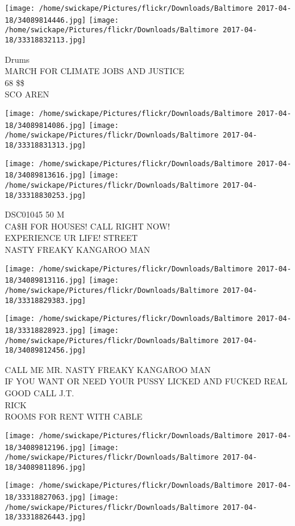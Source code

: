 \documentclass[10pt,letterpaper]{article}
\begin{document}
\texttt{[image: /home/swickape/Pictures/flickr/Downloads/Baltimore 2017-04-18/34089814446.jpg]}
\texttt{[image: /home/swickape/Pictures/flickr/Downloads/Baltimore 2017-04-18/33318832113.jpg]}

Drums\\
MARCH FOR CLIMATE JOBS AND JUSTICE\\
68 \$\$\\
SCO AREN\\
\pagebreak

\texttt{[image: /home/swickape/Pictures/flickr/Downloads/Baltimore 2017-04-18/34089814086.jpg]}
\texttt{[image: /home/swickape/Pictures/flickr/Downloads/Baltimore 2017-04-18/33318831313.jpg]}

\texttt{[image: /home/swickape/Pictures/flickr/Downloads/Baltimore 2017-04-18/34089813616.jpg]}
\texttt{[image: /home/swickape/Pictures/flickr/Downloads/Baltimore 2017-04-18/33318830253.jpg]}

DSC01045 50 M\\
CA\$H FOR HOUSES!  CALL RIGHT NOW!\\
EXPERIENCE UR LIFE! STREET\\
NASTY FREAKY KANGAROO MAN\\
\pagebreak

\texttt{[image: /home/swickape/Pictures/flickr/Downloads/Baltimore 2017-04-18/34089813116.jpg]}
\texttt{[image: /home/swickape/Pictures/flickr/Downloads/Baltimore 2017-04-18/33318829383.jpg]}

\texttt{[image: /home/swickape/Pictures/flickr/Downloads/Baltimore 2017-04-18/33318828923.jpg]}
\texttt{[image: /home/swickape/Pictures/flickr/Downloads/Baltimore 2017-04-18/34089812456.jpg]}

CALL ME MR. NASTY FREAKY KANGAROO MAN\\
IF YOU WANT OR NEED YOUR PUSSY LICKED AND FUCKED REAL GOOD CALL J.T.\\
RICK\\
ROOMS FOR RENT WITH CABLE\\
\pagebreak

\texttt{[image: /home/swickape/Pictures/flickr/Downloads/Baltimore 2017-04-18/34089812196.jpg]}
\texttt{[image: /home/swickape/Pictures/flickr/Downloads/Baltimore 2017-04-18/34089811896.jpg]}

\texttt{[image: /home/swickape/Pictures/flickr/Downloads/Baltimore 2017-04-18/33318827063.jpg]}
\texttt{[image: /home/swickape/Pictures/flickr/Downloads/Baltimore 2017-04-18/33318826443.jpg]}
\end{document}
